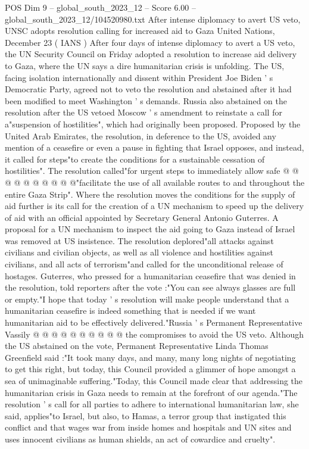 \begin{textsample}{POS Dim 9 – global\_south\_2023\_12 – Score 6.00 – global\_south\_2023\_12/104520980.txt}  \label{ex:f9_pos_005}
After intense diplomacy to avert US veto, UNSC adopts resolution calling for increased aid to Gaza United Nations, December 23 ( IANS ) After four days of intense diplomacy to avert a US veto, the UN Security Council on Friday adopted a resolution to increase aid delivery to Gaza, where the UN says a dire humanitarian crisis is unfolding.
The US, facing isolation internationally and dissent within President Joe Biden ' s Democratic Party, agreed not to veto the resolution and abstained after it had been modified to meet Washington ' s demands.
Russia also abstained on the resolution after the US vetoed Moscow ' s amendment to reinstate a call for a"suspension of hostilities", which had originally been proposed.
Proposed by the United Arab Emirates, the resolution, in deference to the US, avoided any mention of a ceasefire or even a pause in fighting that Israel opposes, and instead, it called for steps"to create the conditions for a sustainable cessation of hostilities".
The resolution called"for urgent steps to immediately allow safe @ @ @ @ @ @ @ @ @ @"facilitate the use of all available routes to and throughout the entire Gaza Strip".
Where the resolution moves the conditions for the supply of aid further is its call for the creation of a UN mechanism to speed up the delivery of aid with an official appointed by Secretary General Antonio Guterres.
A proposal for a UN mechanism to inspect the aid going to Gaza instead of Israel was removed at US insistence.
The resolution deplored"all attacks against civilians and civilian objects, as well as all violence and hostilities against civilians, and all acts of terrorism"and called for the unconditional release of hostages.
Guterres, who pressed for a humanitarian ceasefire that was denied in the resolution, told reporters after the vote :"You can see always glasses are full or empty."I hope that today ' s resolution will make people understand that a humanitarian ceasefire is indeed something that is needed if we want humanitarian aid to be effectively delivered."Russia ' s Permanent Representative Vassily @ @ @ @ @ @ @ @ @ @ the compromises to avoid the US veto.
Although the US abstained on the vote, Permanent Representative Linda Thomas Greenfield said :"It took many days, and many, many long nights of negotiating to get this right, but today, this Council provided a glimmer of hope amongst a sea of unimaginable suffering."Today, this Council made clear that addressing the humanitarian crisis in Gaza needs to remain at the forefront of our agenda."The resolution ' s call for all parties to adhere to international humanitarian law, she said, applies"to Israel, but also, to Hamas, a terror group that instigated this conflict and that wages war from inside homes and hospitals and UN sites and uses innocent civilians as human shields, an act of cowardice and cruelty".

\end{textsample}
